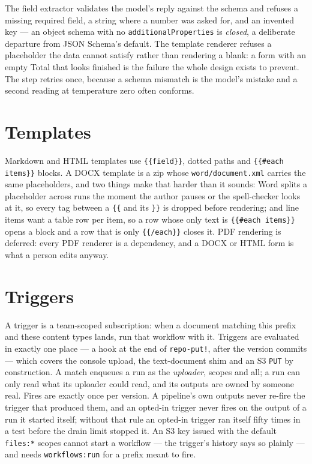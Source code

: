 \documentclass[11pt,a4paper]{report}
\begin{document}
The field extractor validates the model's reply against the schema and refuses a missing required field, a string where a number was asked for, and an invented key --- an object schema with no \texttt{additionalProperties} is \emph{closed}, a deliberate departure from JSON Schema's default. The template renderer refuses a placeholder the data cannot satisfy rather than rendering a blank: a form with an empty Total that looks finished is the failure the whole design exists to prevent. The step retries once, because a schema mismatch is the model's mistake and a second reading at temperature zero often conforms.

\section{Templates}

Markdown and HTML templates use \texttt{\{\{field\}\}}, dotted paths and \texttt{\{\{\#each items\}\}} blocks. A DOCX template is a zip whose \texttt{word/document.xml} carries the same placeholders, and two things make that harder than it sounds: Word splits a placeholder across runs the moment the author pauses or the spell-checker looks at it, so every tag between a \texttt{\{\{} and its \texttt{\}\}} is dropped before rendering; and line items want a table row per item, so a row whose only text is \texttt{\{\{\#each items\}\}} opens a block and a row that is only \texttt{\{\{/each\}\}} closes it. PDF rendering is deferred: every PDF renderer is a dependency, and a DOCX or HTML form is what a person edits anyway.

\section{Triggers}

A trigger is a team-scoped subscription: when a document matching this prefix and these content types lands, run that workflow with it. Triggers are evaluated in exactly one place --- a hook at the end of \texttt{repo-put!}, after the version commits --- which covers the console upload, the text-document shim and an S3 \texttt{PUT} by construction. A match enqueues a run as the \emph{uploader}, scopes and all; a run can only read what its uploader could read, and its outputs are owned by someone real. Fires are exactly once per version. A pipeline's own outputs never re-fire the trigger that produced them, and an opted-in trigger never fires on the output of a run it started itself; without that rule an opted-in trigger ran itself fifty times in a test before the drain limit stopped it. An S3 key issued with the default \texttt{files:*} scopes cannot start a workflow --- the trigger's history says so plainly --- and needs \texttt{workflows:run} for a prefix meant to fire.
\end{document}

